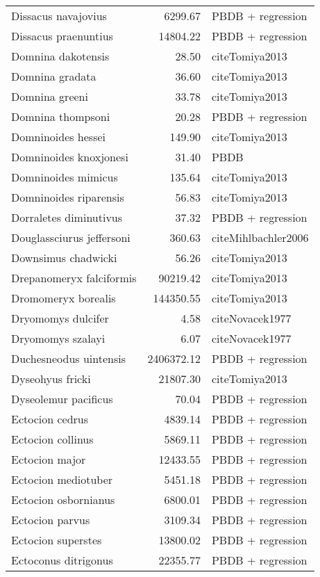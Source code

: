 \begin{table}[ht]
\begin{tabular}{lrl}
  Dissacus navajovius & 6299.67 & PBDB + regression \\ 
  Dissacus praenuntius & 14804.22 & PBDB + regression \\ 
  Domnina dakotensis & 28.50 & cite{Tomiya2013} \\ 
  Domnina gradata & 36.60 & cite{Tomiya2013} \\ 
  Domnina greeni & 33.78 & cite{Tomiya2013} \\ 
  Domnina thompsoni & 20.28 & PBDB + regression \\ 
  Domninoides hessei & 149.90 & cite{Tomiya2013} \\ 
  Domninoides knoxjonesi & 31.40 & PBDB \\ 
  Domninoides mimicus & 135.64 & cite{Tomiya2013} \\ 
  Domninoides riparensis & 56.83 & cite{Tomiya2013} \\ 
  Dorraletes diminutivus & 37.32 & PBDB + regression \\ 
  Douglassciurus jeffersoni & 360.63 & cite{Mihlbachler2006} \\ 
  Downsimus chadwicki & 56.26 & cite{Tomiya2013} \\ 
  Drepanomeryx falciformis & 90219.42 & cite{Tomiya2013} \\ 
  Dromomeryx borealis & 144350.55 & cite{Tomiya2013} \\ 
  Dryomomys dulcifer & 4.58 & cite{Novacek1977} \\ 
  Dryomomys szalayi & 6.07 & cite{Novacek1977} \\ 
  Duchesneodus uintensis & 2406372.12 & PBDB + regression \\ 
  Dyseohyus fricki & 21807.30 & cite{Tomiya2013} \\ 
  Dyseolemur pacificus & 70.04 & PBDB + regression \\ 
  Ectocion cedrus & 4839.14 & PBDB + regression \\ 
  Ectocion collinus & 5869.11 & PBDB + regression \\ 
  Ectocion major & 12433.55 & PBDB + regression \\ 
  Ectocion mediotuber & 5451.18 & PBDB + regression \\ 
  Ectocion osbornianus & 6800.01 & PBDB + regression \\ 
  Ectocion parvus & 3109.34 & PBDB + regression \\ 
  Ectocion superstes & 13800.02 & PBDB + regression \\ 
  Ectoconus ditrigonus & 22355.77 & PBDB + regression \\ 

\end{tabular}
\end{table}
